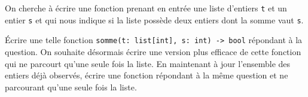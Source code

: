 \documentclass{magnolia}
\begin{document}


On cherche à écrire une fonction prenant en entrée une liste d'entiers \verb!t! et un entier \verb!s! et
qui nous indique si la liste possède deux entiers dont la somme vaut \verb!s!.
\begin{questions}
\question Écrire une telle fonction \verb!somme(t: list[int], s: int) -> bool! répondant à la question.
\question On souhaite désormais écrire une version plus efficace de cette fonction qui ne parcourt qu'une
  seule fois la liste. En maintenant à jour l'ensemble des entiers déjà observés, écrire une fonction
  répondant à la même question et ne parcourant qu'une seule fois la liste.
\end{questions}






\end{document}
